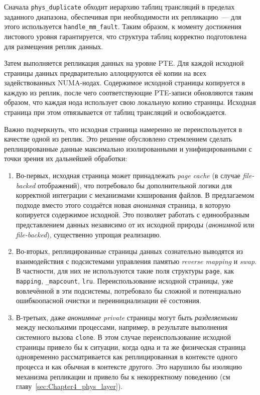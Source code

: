 Сначала \texttt{phys\_duplicate} обходит иерархию таблиц трансляций в пределах заданного диапазона, обеспечивая при необходимости их репликацию~--- для этого используется \texttt{handle\_mm\_fault}. Таким образом, к моменту достижения листового уровня гарантируется, что структура таблиц корректно подготовлена для размещения реплик данных.

Затем выполняется репликация данных на уровне PTE. Для каждой исходной страницы данных предварительно аллоцируются её копии на всех задействованных NUMA-нодах. Содержимое исходной страницы копируется в каждую из реплик, после чего соответствующие PTE-записи обновляются таким образом, что каждая нода использует свою локальную копию страницы. Исходная страница при этом отвязывается от таблиц трансляций и освобождается.

Важно подчеркнуть, что исходная страница намеренно не переиспользуется в качестве одной из реплик. Это решение обусловлено стремлением сделать реплицированные данные максимально изолированными и унифицированными с точки зрения их дальнейшей обработки:
\begin{enumerate}
    \item Во-первых, исходная страница может принадлежать \textit{page cache} (в случае \textit{file-backed} отображений), что потребовало бы дополнительной логики для корректной интеграции с механизмами кэширования файлов. В предлагаемом подходе вместо этого создаётся новая \textit{анонимная} страница, в которую копируется содержимое исходной. Это позволяет работать с единообразным представлением данных независимо от их исходной природы (\textit{анонимной} или \textit{file-backed}), существенно упрощая реализацию.

    \item Во-вторых, реплицированные страницы данных сознательно выводятся из взаимодействия с подсистемами управления памятью \textit{reverse mapping} и \textit{swap}. В частности, для них не используются такие поля структуры \texttt{page}, как \texttt{mapping}, \texttt{\_mapcount}, \texttt{lru}. Переиспользование исходной страницы, уже вовлечённой в эти подсистемы, потребовало бы сложной и потенциально ошибкоопасной очистки и переинициализации её состояния.

    \item В-третьих, даже \textit{анонимные private} страницы могут быть \textit{разделяемыми} между несколькими процессами, например, в результате выполнения системного вызова \texttt{clone}. В этом случае переиспользование исходной страницы привело бы к ситуации, когда одна и та же физическая страница одновременно рассматривается как реплицированная в контексте одного процесса и как обычная в контексте другого. Это нарушило бы изоляцию механизма репликации и привело бы к некорректному поведению (см главу~\ref{sec:Chapter4_phys_layer}).
\end{enumerate}

